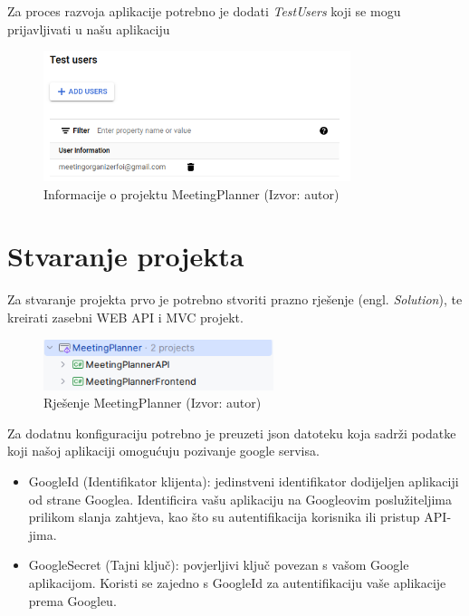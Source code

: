 \documentclass{foi}
\begin{document}
Za proces razvoja aplikacije potrebno je dodati \textit{TestUsers} koji se mogu prijavljivati u našu aplikaciju
\begin{figure}[H]
    \centering
    \includegraphics[width=0.8\textwidth]{slike/TestUSers.png}
    \caption{Informacije o projektu MeetingPlanner (Izvor: autor)}
    \label{fig:TestUsers}
\end{figure}

\section{Stvaranje projekta}
Za stvaranje projekta prvo je potrebno stvoriti prazno rješenje (engl. \textit{Solution}), te kreirati zasebni WEB API i MVC projekt.
\begin{figure}[H]
    \centering
    \includegraphics[width=0.6\textwidth]{slike/struktura.png}
    \caption{Rješenje MeetingPlanner (Izvor: autor)}
    \label{fig:struktura}

\end{figure}
Za dodatnu konfiguraciju potrebno je preuzeti json datoteku koja sadrži podatke koji našoj aplikaciji omogućuju pozivanje google servisa. 
\begin{itemize}
    \item GoogleId (Identifikator klijenta): jedinstveni identifikator dodijeljen aplikaciji od strane Googlea. Identificira vašu aplikaciju na Googleovim poslužiteljima prilikom slanja zahtjeva, kao što su autentifikacija korisnika ili pristup API-jima.
    \item GoogleSecret (Tajni ključ): povjerljivi ključ povezan s vašom Google aplikacijom. Koristi se zajedno s GoogleId za autentifikaciju vaše aplikacije prema Googleu.
\end{itemize}
\newpage
\end{document}

